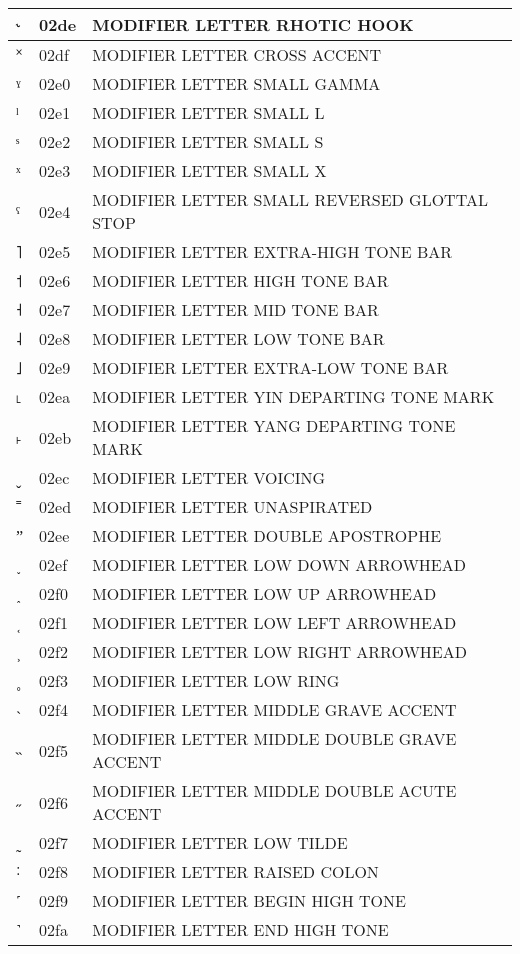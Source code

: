 \documentclass[12pt,letterpaper,openany]{book}
\begin{document}
\begin{center}
\begin{supertabular}{|m{0.25in}|m{0.5in}|m{4in}|}
˞ & 02de & MODIFIER LETTER RHOTIC HOOK\\\hline
˟ & 02df & MODIFIER LETTER CROSS ACCENT\\\hline
ˠ & 02e0 & MODIFIER LETTER SMALL GAMMA\\\hline
ˡ & 02e1 & MODIFIER LETTER SMALL L\\\hline
ˢ & 02e2 & MODIFIER LETTER SMALL S\\\hline
ˣ & 02e3 & MODIFIER LETTER SMALL X\\\hline
ˤ & 02e4 & MODIFIER LETTER SMALL REVERSED GLOTTAL STOP\\\hline
˥ & 02e5 & MODIFIER LETTER EXTRA-HIGH TONE BAR\\\hline
˦ & 02e6 & MODIFIER LETTER HIGH TONE BAR\\\hline
˧ & 02e7 & MODIFIER LETTER MID TONE BAR\\\hline
˨ & 02e8 & MODIFIER LETTER LOW TONE BAR\\\hline
˩ & 02e9 & MODIFIER LETTER EXTRA-LOW TONE BAR\\\hline
˪ & 02ea & MODIFIER LETTER YIN DEPARTING TONE MARK\\\hline
˫ & 02eb & MODIFIER LETTER YANG DEPARTING TONE MARK\\\hline
ˬ & 02ec & MODIFIER LETTER VOICING\\\hline
˭ & 02ed & MODIFIER LETTER UNASPIRATED\\\hline
ˮ & 02ee & MODIFIER LETTER DOUBLE APOSTROPHE\\\hline
˯ & 02ef & MODIFIER LETTER LOW DOWN ARROWHEAD\\\hline
˰ & 02f0 & MODIFIER LETTER LOW UP ARROWHEAD\\\hline
˱ & 02f1 & MODIFIER LETTER LOW LEFT ARROWHEAD\\\hline
˲ & 02f2 & MODIFIER LETTER LOW RIGHT ARROWHEAD\\\hline
˳ & 02f3 & MODIFIER LETTER LOW RING\\\hline
˴ & 02f4 & MODIFIER LETTER MIDDLE GRAVE ACCENT\\\hline
˵ & 02f5 & MODIFIER LETTER MIDDLE DOUBLE GRAVE ACCENT\\\hline
˶ & 02f6 & MODIFIER LETTER MIDDLE DOUBLE ACUTE ACCENT\\\hline
˷ & 02f7 & MODIFIER LETTER LOW TILDE\\\hline
˸ & 02f8 & MODIFIER LETTER RAISED COLON\\\hline
˹ & 02f9 & MODIFIER LETTER BEGIN HIGH TONE\\\hline
˺ & 02fa & MODIFIER LETTER END HIGH TONE\\\hline

\end{supertabular}
\end{center}
\end{document}
